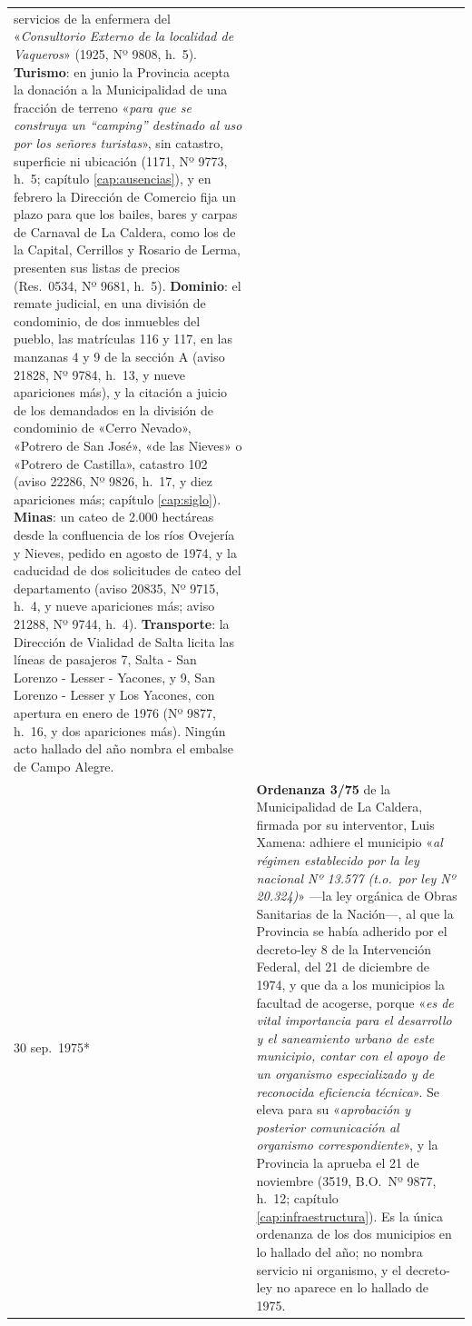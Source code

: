 \begin{longtable}{@{}p{2.7cm}p{10.3cm}@{}}
servicios de la enfermera del «\textit{Consultorio Externo de la localidad de Vaqueros}» (1925, Nº 9808, h.\ 5). \textbf{Turismo}: en junio la Provincia acepta la donación a la Municipalidad de una fracción de terreno «\textit{para que se construya un ``camping'' destinado al uso por los señores turistas}», sin catastro, superficie ni ubicación (1171, Nº 9773, h.\ 5; capítulo \ref{cap:ausencias}), y en febrero la Dirección de Comercio fija un plazo para que los bailes, bares y carpas de Carnaval de La Caldera, como los de la Capital, Cerrillos y Rosario de Lerma, presenten sus listas de precios (Res.\ 0534, Nº 9681, h.\ 5). \textbf{Dominio}: el remate judicial, en una división de condominio, de dos inmuebles del pueblo, las matrículas 116 y 117, en las manzanas 4 y 9 de la sección A (aviso 21828, Nº 9784, h.\ 13, y nueve apariciones más), y la citación a juicio de los demandados en la división de condominio de «Cerro Nevado», «Potrero de San José», «de las Nieves» o «Potrero de Castilla», catastro 102 (aviso 22286, Nº 9826, h.\ 17, y diez apariciones más; capítulo \ref{cap:siglo}). \textbf{Minas}: un cateo de 2.000 hectáreas desde la confluencia de los ríos Ovejería y Nieves, pedido en agosto de 1974, y la caducidad de dos solicitudes de cateo del departamento (aviso 20835, Nº 9715, h.\ 4, y nueve apariciones más; aviso 21288, Nº 9744, h.\ 4). \textbf{Transporte}: la Dirección de Vialidad de Salta licita las líneas de pasajeros 7, Salta - San Lorenzo - Lesser - Yacones, y 9, San Lorenzo - Lesser y Los Yacones, con apertura en enero de 1976 (Nº 9877, h.\ 16, y dos apariciones más). Ningún acto hallado del año nombra el embalse de Campo Alegre. \\
30 sep.\ 1975* & \textbf{Ordenanza 3/75} de la Municipalidad de La Caldera, firmada por su interventor, Luis Xamena: adhiere el municipio «\textit{al régimen establecido por la ley nacional Nº 13.577 (t.o.\ por ley Nº 20.324)}» ---la ley orgánica de Obras Sanitarias de la Nación---, al que la Provincia se había adherido por el decreto-ley 8 de la Intervención Federal, del 21 de diciembre de 1974, y que da a los municipios la facultad de acogerse, porque «\textit{es de vital importancia para el desarrollo y el saneamiento urbano de este municipio, contar con el apoyo de un organismo especializado y de reconocida eficiencia técnica}». Se eleva para su «\textit{aprobación y posterior comunicación al organismo correspondiente}», y la Provincia la aprueba el 21 de noviembre (3519, B.O.\ Nº 9877, h.\ 12; capítulo \ref{cap:infraestructura}). Es la única ordenanza de los dos municipios en lo hallado del año; no nombra servicio ni organismo, y el decreto-ley no aparece en lo hallado de 1975. \\

\end{longtable}
